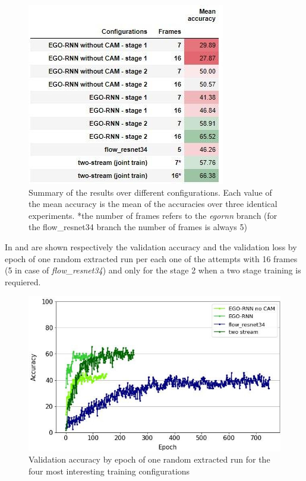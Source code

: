 \documentclass[10pt,twocolumn,hidelinks,letterpaper]{article}
\begin{document}
\begin{figure}[t]
	\centering
	\includegraphics[width=\linewidth]{images/step1_table.jpg}
	\caption{Summary of the results over different configurations. Each value of the mean accuracy is the mean of the accuracies over three identical experiments. \small{*the number of frames refers to the \textit{egornn} branch (for the flow\_resnet34 branch the number of frames is always 5)}}
	\label{step1_table}
\end{figure}

In  and  are shown respectively the validation accuracy and the validation loss by epoch of one random extracted run per each one of the attempts with 16 frames (5 in case of \textit{flow\_resnet34}) and only for the stage 2 when a two stage training is requiered.

\begin{figure}[t]
	\centering
	\includegraphics[width=\linewidth]{images/step1_acc.jpg}
	\caption{Validation accuracy by epoch of one random extracted run for the four most interesting training configurations}
	\label{step1_acc}
\end{figure}
\end{document}

